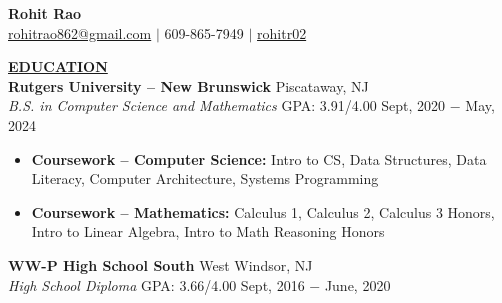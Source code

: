 \documentclass{article}
\begin{document}
\begin{center}
\thispagestyle{empty}
\LARGE \textbf{Rohit Rao\\}
\normalsize \href{mailto:rohitrao862@gmail.com}{rohitrao862@gmail.com} $\mid$ 609-865-7949 $\mid$ \faGithub \href{https://github.com/rohitr02}{ rohitr02}\\
\hrulefill
\end{center}



\noindent \textbf{\underline{EDUCATION}} \\
\textbf{Rutgers University -- New Brunswick} \hfill Piscataway, NJ \\
\textit{B.S. in Computer Science and Mathematics}  \hspace{1.40cm} GPA: 3.91/4.00 \hfill Sept, 2020 $-$ May, 2024
\begin{itemize}[noitemsep,nolistsep, leftmargin=*]
    \item {\textbf{Coursework -- Computer Science:} Intro to CS, Data Structures, Data Literacy, Computer Architecture, Systems Programming}
    \item {\textbf{Coursework -- Mathematics:} Calculus 1, Calculus 2, Calculus 3 Honors, Intro to Linear Algebra, Intro to Math Reasoning Honors} \\
\end{itemize}
\textbf{WW-P High School South} \hfill West Windsor, NJ \\
\textit{High School Diploma} \hfill{GPA: 3.66/4.00} \hfill Sept, 2016 $-$ June, 2020 \\
\end{document}
